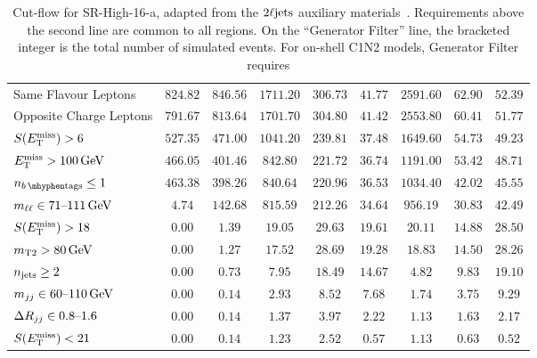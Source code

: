 \begin{sidewaystable}[tp]
{\begin{tabular}{lcccccccc}
Same Flavour Leptons                                       & $824.82$ & $846.56$ & $1711.20$ & $306.73$ & $41.77$ & $2591.60$ & $62.90$ & $52.39$ \\
Opposite Charge Leptons                                   & $791.67$ & $813.64$ & $1701.70$ & $304.80$ & $41.42$ & $2553.80$ & $60.41$ & $51.77$ \\
$\metsig > 6$                                               & $527.35$ & $471.00$ & $1041.20$ & $239.81$ & $37.48$ & $1649.60$ & $54.73$ & $49.23$ \\
$\met > 100\,\eV[G]$                                           & $466.05$ & $401.46$ & $842.80$ & $221.72$ & $36.74$ & $1191.00$ & $53.42$ & $48.71$ \\
\hline
$\nbtag \leq 1$                                          & $463.38$ & $398.26$ & $840.64$ & $220.96$ & $36.53$ & $1034.40$ & $42.02$ & $45.55$ \\
$\mll \in 71\textrm{--}111\,\eV[G]$                            & $4.74$ & $142.68$ & $815.59$ & $212.26$ & $34.64$ & $956.19$ & $30.83$ & $42.49$ \\
$\metsig > 18$                                            & $0.00$ & $1.39$ & $19.05$ & $29.63$ & $19.61$ & $20.11$ & $14.88$ & $28.50$ \\
$\mttwo > 80\,\eV[G]$                                        & $0.00$ & $1.27$ & $17.52$ & $28.69$ & $19.28$ & $18.83$ & $14.50$ & $28.26$ \\
$\njet \geq 2$                               & $0.00$ & $0.73$ & $7.95$ & $18.49$ & $14.67$ & $4.82$ & $9.83$ & $19.10$ \\
$\mjj \in 60\text{--}110\,\eV[G]$                            & $0.00$ & $0.14$ & $2.93$ & $8.52$ & $7.68$ & $1.74$ & $3.75$ & $9.29$ \\
$\rjj \in 0.8\text{--}1.6$                                & $0.00$ & $0.14$ & $1.37$ & $3.97$ & $2.22$ & $1.13$ & $1.63$ & $2.17$ \\
$\metsig < 21$                                            & $0.00$ & $0.14$ & $1.23$ & $2.52$ & $0.57$ & $1.13$ & $0.63$ & $0.52$ \\
\end{tabular}
}
\caption[
Cut-flow for SR-High-16-a
]{%
Cut-flow for SR-High-16-a,
adapted from the $\twoljets$ auxiliary materials~\cite{hepdata.116034}.
Requirements above the second line are common to all regions.
On the ``Generator Filter'' line, the bracketed integer is the total number of
simulated events.
For on-shell C1N2 models, Generator Filter requires
}
\end{sidewaystable}

